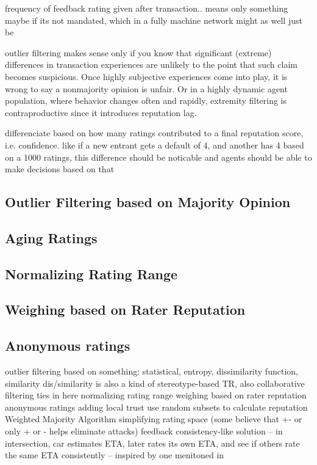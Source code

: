 \documentclass[%
    ]{\PathToTumTemplate/thesis/tum_thesis}
\begin{document}
frequency of feedback rating given after transaction.. means only something maybe if its not mandated, which in a fully machine network might as well just be

outlier filtering makes sense only if you know that significant (extreme) differences in transaction experiences are unlikely to the point that such claim becomes suspicious. Once highly subjective experiences come into play, it is wrong to say a nonmajority opinion is unfair. Or in a highly dynamic agent population, where behavior changes often and rapidly, extremity filtering is contraproductive since it introduces reputation lag.



differenciate based on how many ratings contributed to a final reputation score, i.e. confidence. like if a new entrant gets a default of 4, and another has 4 based on a 1000 ratings, this difference should be noticable and agents should be able to make decisions based on that

\subsection{Outlier Filtering based on Majority Opinion}

\subsection{Aging Ratings}

\subsection{Normalizing Rating Range}

\subsection{Weighing based on Rater Reputation}

\subsection{Anonymous ratings}


outlier filtering based on something: statistical, entropy, dissimilarity function, similarity
dis/similarity is also a kind of stereotype-based TR, also collaborative filtering ties in here
normalizing rating range
weighing based on rater reputation
anonymous ratings
adding local trust
use random subsets to calculate reputation
Weighted Majority Algorithm 
simplifying rating space (some believe that +- or only + or - helps eliminate attacks)
feedback consistency-like solution -- in intersection, car estimates ETA, later rates its own ETA, and see if others rate the same ETA consistently -- inspired by one menitoned in \cite{azzedin_identifying_2010}
\end{document}
